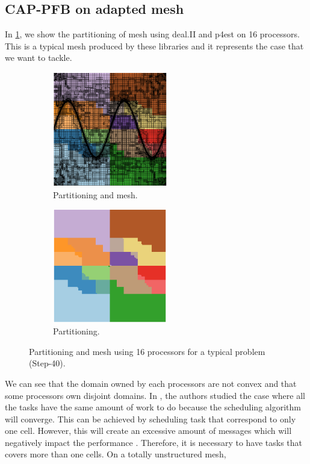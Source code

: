 \documentclass[letterpaper]{article}
\renewcommand{\(}{\left(}
\renewcommand{\)}{\right)}
\renewcommand{\[}{\left[}
\renewcommand{\]}{\right]}
\begin{document}
\subsection{CAP-PFB on adapted mesh}
In \cref{subdomain_id}, we show the partitioning of mesh using deal.II and p4est 
on 16 processors. This is a typical mesh produced by these libraries and it 
represents the case that we want to tackle. 
\begin{figure}[H]
  \begin{subfigure}[b]{.5\textwidth}
    \centering
    \includegraphics[width=5cm]{subdomain_id_0}
    \caption{Partitioning and mesh.}
  \end{subfigure}
  \begin{subfigure}[b]{.5\textwidth}
    \centering
    \includegraphics[width=5cm]{subdomain_id_1}
    \caption{Partitioning.}
  \end{subfigure}
  \caption{Partitioning and mesh using 16 processors for a typical problem
  (Step-40).}
  \label{subdomain_id}
\end{figure}
We can see that the domain owned by each processors are not convex and that some
processors own disjoint domains. In \cite{Mo2014}, the authors studied the case
where all the tasks have the same amount of work to do because the scheduling
algorithm will converge. This can be achieved by scheduling task that correspond
to only one cell. However, this will create an excessive amount of messages
which will negatively impact the performance \cite{}. Therefore, it is necessary
to have tasks that covers more than one cells. On a totally unstructured mesh,
\end{document}
